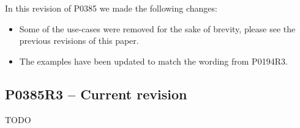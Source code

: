 In this revision of P0385 we made the following changes:

\begin{itemize}
\item Some of the use-cases were removed for the sake of brevity, please see
	the previous revisions of this paper.
\item The examples have been updated to match the wording from P0194R3.
\end{itemize}

\subsection{P0385R3 -- Current revision}

TODO


